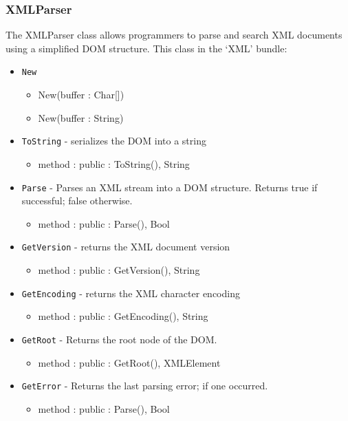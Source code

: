 \documentclass[12pt]{article}
\begin{document}
\subsubsection{XMLParser}
The XMLParser class allows programmers to parse and search XML
documents using a simplified DOM structure.  This class in the `XML'
bundle:
\begin{itemize}
\item \texttt{New}
  \begin{itemize}
  \item New(buffer : Char[])
  \item New(buffer : String)
  \end{itemize}
\item \texttt{ToString} - serializes the DOM into a string
  \begin{itemize}
  \item method : public : ToString(), String
  \end{itemize}
\item \texttt{Parse} - Parses an XML stream into a DOM structure.
  Returns true if successful; false otherwise.
  \begin{itemize}
  \item method : public : Parse(), Bool
  \end{itemize}
\item \texttt{GetVersion} - returns the XML document version
  \begin{itemize}
  \item method : public : GetVersion(), String
  \end{itemize}
\item \texttt{GetEncoding} - returns the XML character encoding
  \begin{itemize}
  \item method : public : GetEncoding(), String
  \end{itemize}
\item \texttt{GetRoot} - Returns the root node of the DOM.
  \begin{itemize}
  \item method : public : GetRoot(), XMLElement
  \end{itemize}
\item \texttt{GetError} - Returns the last parsing error; if one
  occurred.
  \begin{itemize}
  \item method : public : Parse(), Bool
  \end{itemize}
\end{itemize}
\end{document}

